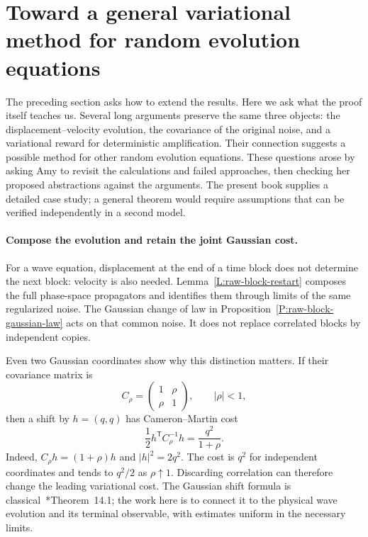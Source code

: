 \section{Toward a general variational method for random evolution equations}
\label{S:theory-outlook}

The preceding section asks how to extend the results. Here we ask what the
proof itself teaches us. Several long arguments preserve the same three
objects: the displacement--velocity evolution, the covariance of the original
noise, and a variational reward for deterministic amplification. Their
connection suggests a possible method for other random evolution equations.
These questions arose by asking Amy to revisit the calculations and failed
approaches, then checking her proposed abstractions against the arguments.
The present book supplies a detailed case study; a general theorem would
require assumptions that can be verified independently in a second model.

\paragraph{Compose the evolution and retain the joint Gaussian cost.}
For a wave equation, displacement at the end of a time block does not determine
the next block: velocity is also needed. Lemma~\ref{L:raw-block-restart}
composes the full phase-space propagators and identifies them through limits
of the same regularized noise. The Gaussian change of
law in Proposition~\ref{P:raw-block-gaussian-law} acts on that common noise.
It does not replace correlated blocks by independent copies.

Even two Gaussian coordinates show why this distinction matters. If their
covariance matrix is
\[
  C_\rho=\begin{pmatrix}1&\rho\\\rho&1\end{pmatrix},\qquad |\rho|<1,
\]
then a shift by $h=(q,q)$ has Cameron--Martin cost
\[
  \frac12 h^{\mathsf T}C_\rho^{-1}h=\frac{q^2}{1+\rho}.
\]
Indeed, $C_\rho h=(1+\rho)h$ and $|h|^2=2q^2$. The cost is $q^2$ for
independent coordinates and tends to $q^2/2$ as $\rho\uparrow1$.
Discarding correlation can therefore change the leading variational cost.
The Gaussian shift formula is classical~\cite{janson:97:gaussian}*{Theorem~14.1};
the work here is to connect it to the physical wave evolution and its terminal
observable, with estimates uniform in the necessary limits.

